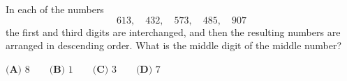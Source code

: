 In each of the numbers
\[613,\quad432,\quad573,\quad485,\quad907\]
the first and third digits are interchanged, and then the resulting numbers are arranged in descending order. What is the middle digit of the middle number?

$\textbf{(A) }8\qquad\textbf{(B) }1\qquad\textbf{(C) }3\qquad\textbf{(D) }7$
